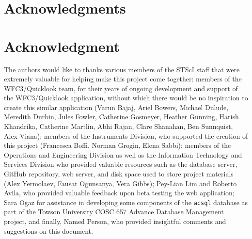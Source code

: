 \documentclass[10pt,journal,compsoc]{IEEEtran}
\begin{document}
\ifCLASSOPTIONcompsoc
  \section*{Acknowledgments}
\else
  \section*{Acknowledgment}
\fi
  The authors would like to thanks various members of the STScI staff that were extremely valuable for helping make this project come together: members of the WFC3/Quicklook team, for their years of
  ongoing development and support of the WFC3/Quicklook application, without which there would be no inspiration to create this similar application (Varun Bajaj, Ariel Bowers, Michael Dulude,
  Meredith Durbin, Jules Fowler, Catherine Gosmeyer, Heather Gunning, Harish Khandrika, Catherine Martlin, Abhi Rajan, Clare Shanahan, Ben Sunnquist, Alex Viana); members of the Instruments Division,
  who supported the creation of this project (Francesca Boffi, Norman Grogin, Elena Sabbi); members of the Operations and Engineering Division as well as the Information Technology and Services
  Division who provided valuable resources such as the database server, GitHub repository, web server, and disk space used to store project materials (Alex Yermolaev, Fausat Ogunsanya, Vera Gibbs);
  Pey-Lian Lim and Roberto Avila, who provided valuable feedback upon beta testing the web application; Sara Ogaz for assistance in developing some components of the \texttt{acsql} database as part
  of the Towson University COSC 657 Advance Database Management project, and finally, Named Person, who provided insightful comments and suggestions on this document.


\ifCLASSOPTIONcaptionsoff
  \newpage
\fi
\end{document}
